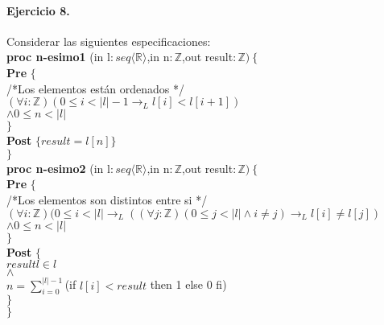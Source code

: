 \documentclass[a4paper]{article}
\begin{document}
\paragraph*{Ejercicio 8.} Considerar las siguientes especificaciones:\medskip \\
\textbf{proc n-esimo1 }(in l$: seq\langle \mathbb{R}\rangle$,in n$: \mathbb{Z}$,out result$:\mathbb{Z})\ \{$\smallskip \\
		\hspace*{6mm} \textbf{Pre }$\{$\\
		\hspace*{6mm} /*Los elementos están ordenados */\\
		\hspace*{6mm} $(\forall i:\mathbb{Z})(0\leq i < |l|-1
				\rightarrow_L l[i]<l[i+1])$\\
		\hspace*{6mm} $\wedge 0 \leq n < |l|$\\
		\hspace*{6mm} $\}$\\
		\hspace*{6mm} \textbf{Post }$\{result=l[n]\}$\\
		$\}$\medskip \\
		
\textbf{proc n-esimo2 }(in l$: seq\langle \mathbb{R}\rangle$,in n$: \mathbb{Z}$,out result$:\mathbb{Z})\ \{$\smallskip \\
		\hspace*{6mm} \textbf{Pre }$\{$\\
		\hspace*{6mm} /*Los elementos son distintos entre si */\\
		\hspace*{6mm} $(\forall i:\mathbb{Z})(0\leq i < |l|
				\rightarrow_L ((\forall j:\mathbb{Z})(0\leq j < |l|
				\wedge i \neq j)\rightarrow_L l[i]\neq l[j])$\\
		\hspace*{6mm} $\wedge 0 \leq n < |l|$\\
		\hspace*{6mm} $\}$\\
		\hspace*{6mm} \textbf{Post }$\{$\\
		\hspace*{6mm} $resultl\in l$\\
		\hspace*{6mm} $\wedge$\\
		\hspace*{6mm} $n=\sum_{i=0}^{|l|-1}$(if $l[i]<result$ then 1 else 0 fi)\\
		\hspace*{6mm} $\}$\\
		$\}$\medskip \\
	
\end{document}
